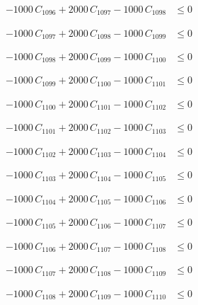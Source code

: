 \documentclass[a4paper,11pt]{article}
\begin{document}
\begin{align}
-1000\,C_{1096} + 2000\,C_{1097} - 1000\,C_{1098} &\leq 0 \nonumber
\end{align}

\begin{align}
-1000\,C_{1097} + 2000\,C_{1098} - 1000\,C_{1099} &\leq 0 \nonumber
\end{align}

\begin{align}
-1000\,C_{1098} + 2000\,C_{1099} - 1000\,C_{1100} &\leq 0 \nonumber
\end{align}

\begin{align}
-1000\,C_{1099} + 2000\,C_{1100} - 1000\,C_{1101} &\leq 0 \nonumber
\end{align}

\begin{align}
-1000\,C_{1100} + 2000\,C_{1101} - 1000\,C_{1102} &\leq 0 \nonumber
\end{align}

\begin{align}
-1000\,C_{1101} + 2000\,C_{1102} - 1000\,C_{1103} &\leq 0 \nonumber
\end{align}

\begin{align}
-1000\,C_{1102} + 2000\,C_{1103} - 1000\,C_{1104} &\leq 0 \nonumber
\end{align}

\begin{align}
-1000\,C_{1103} + 2000\,C_{1104} - 1000\,C_{1105} &\leq 0 \nonumber
\end{align}

\begin{align}
-1000\,C_{1104} + 2000\,C_{1105} - 1000\,C_{1106} &\leq 0 \nonumber
\end{align}

\begin{align}
-1000\,C_{1105} + 2000\,C_{1106} - 1000\,C_{1107} &\leq 0 \nonumber
\end{align}

\begin{align}
-1000\,C_{1106} + 2000\,C_{1107} - 1000\,C_{1108} &\leq 0 \nonumber
\end{align}

\begin{align}
-1000\,C_{1107} + 2000\,C_{1108} - 1000\,C_{1109} &\leq 0 \nonumber
\end{align}

\begin{align}
-1000\,C_{1108} + 2000\,C_{1109} - 1000\,C_{1110} &\leq 0 \nonumber
\end{align}
\end{document}
